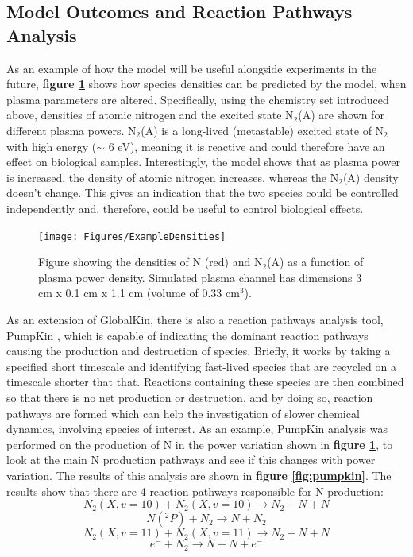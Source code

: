 \documentclass[11pt, oneside]{article}   	%
\begin{document}
\subsection{Model Outcomes and Reaction Pathways Analysis}

As an example of how the model will be useful alongside experiments in the future, \textbf{figure \ref{fig:ExamplePowerVar}} shows how species densities can be predicted by the model, when plasma parameters are altered.
Specifically, using the chemistry set introduced above, densities of atomic nitrogen and the excited state N$_2$(A) are shown for different plasma powers.
N$_2$(A) is a long-lived (metastable) excited state of N$_2$ with high energy ($\sim$ 6 eV), meaning it is reactive and could therefore have an effect on biological samples.
Interestingly, the model shows that as plasma power is increased, the density of atomic nitrogen increases, whereas the N$_2$(A) density doesn't change.
This gives an indication that the two species could be controlled independently and, therefore, could be useful to control biological effects.

\begin{figure}
\centering
\texttt{[image: Figures/ExampleDensities]}
\caption{Figure showing the densities of N (red) and N$_2$(A) as a function of plasma power density. Simulated plasma channel has dimensions 3 cm x 0.1 cm x 1.1 cm (volume of 0.33 cm$^3$).}
\label{fig:ExamplePowerVar}
\end{figure}


As an extension of GlobalKin, there is also a reaction pathways analysis tool, PumpKin \cite{Markosyan2014pumpkin}, which is capable of indicating the dominant reaction pathways causing the production and destruction of species.
Briefly, it works by taking a specified short timescale and identifying fast-lived species that are recycled on a timescale shorter that that.
Reactions containing these species are then combined so that there is no net production or destruction, and by doing so, reaction pathways are formed which can help the investigation of slower chemical dynamics, involving species of interest.
As an example, PumpKin analysis was performed on the production of N in the power variation shown in \textbf{figure \ref{fig:ExamplePowerVar}}, to look at the main N production pathways and see if this changes with power variation.
The results of this analysis are shown in \textbf{figure \ref{fig:pumpkin}}.
The results show that there are 4 reaction pathways responsible for N production:
\begin{equation}
N_2(X, v=10) + N_2(X, v=10) \rightarrow N_2 + N + N
\label{eqn1}
\end{equation}
\begin{equation}
N(^2P) + N_2 \rightarrow N + N_2
\label{eqn2}
\end{equation}
\begin{equation}
N_2(X, v=11) + N_2(X, v=11) \rightarrow N_2 + N + N
\label{eqn3}
\end{equation}
\begin{equation}
e^- + N_2 \rightarrow  N + N + e^-
\label{eqn4}
\end{equation}
\end{document}
